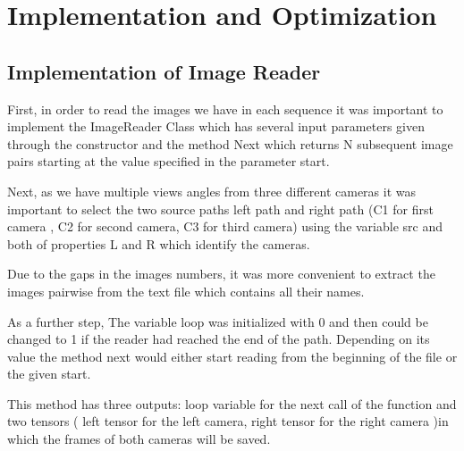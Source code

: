 \section{Implementation and Optimization}
\subsection{Implementation of Image Reader}
\label{subsec:Implementation of Image Reader}

First, in order to read the images we have in each sequence it was important to implement the ImageReader Class which has several input parameters given through the constructor and the method Next which returns N subsequent image pairs starting at the value specified in the parameter start.

Next, as we have multiple views angles from three different cameras it was important to select the two source paths left path and right path (C1 for first camera , C2 for second camera, C3 for third camera) using the variable src and both of properties L and R which identify the cameras. 
 
Due to the gaps in the images numbers, it was more convenient to extract the images pairwise from the text file which contains all their names. 

As a further step, The variable loop was initialized with 0 and then could be changed to 1 if the reader had reached the end of the path. Depending on its value the method next would either start reading from the beginning of the file or the given start.

This method has three outputs: loop variable for the next call of the function and two tensors ( left tensor for the left camera, right tensor for the right camera )in which the frames of both cameras will be saved.